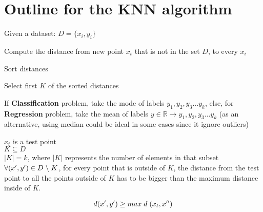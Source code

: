 \section{Outline for the KNN algorithm}
\begin{outline}

    \1  Given a dataset: $D=\{x_i,y_i\}$

    \1  Compute the distance from new point $x_t$ that is not in the set $D$, to every $x_i$

    \1  Sort distances

    \1  Select first $K$ of the sorted distances

    \1  If \textbf{Classification} problem, take the mode of labels $y_1, y_2, y_3 ... y_k$, else, for \textbf{Regression}
        problem, take the mean of labels $y \in \mathbb{R} \rightarrow y_1, y_2, y_3 ... y_k$ (as an alternative, using median could be
        ideal in some cases since it ignore outliers)

\end{outline}

$x_t$ is a test point\\

$K \subseteq D$ \\

$|K| = k$, where $|K|$ represents the number of elements in that subset\\

$\forall(x^{\prime},y^{\prime}) \in D \hspace{1 mm} \backslash \hspace{1 mm} K$, for every point that is outside of $K$,
the distance from the test point to all the points outside of $K$ has to be bigger than the maximum distance inside of $K$.

\[
    d(x^{\prime},y^{\prime}) \geq max \hspace{1 mm} d \hspace{1 mm} (x_t, x^{\prime\prime})
\]


